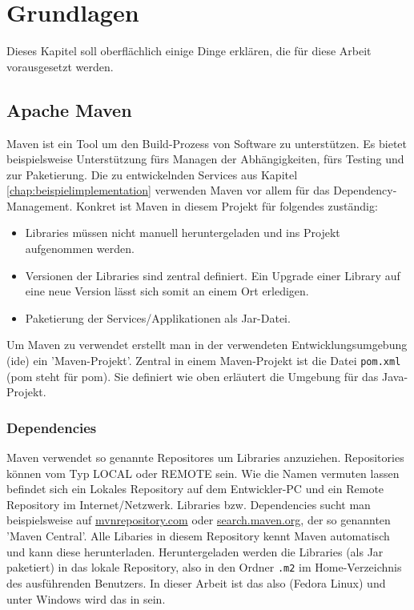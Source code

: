 \chapter{Grundlagen}
\label{chap:voraussetzungen}
Dieses Kapitel soll oberflächlich einige Dinge erklären, die für diese Arbeit vorausgesetzt werden.
\section{Apache Maven}
\label{chap:maven}
Maven ist ein Tool um den Build-Prozess von Software zu unterstützen. Es bietet beispielsweise Unterstützung fürs Managen der Abhängigkeiten, fürs Testing und zur Paketierung. Die zu entwickelnden Services aus Kapitel \ref{chap:beispielimplementation} verwenden Maven vor allem für das Dependency-Management. Konkret ist Maven in diesem Projekt für folgendes zuständig:
\begin{itemize}
	\item
	Libraries müssen nicht manuell heruntergeladen und ins Projekt aufgenommen werden.
	\item
	Versionen der Libraries sind zentral definiert. Ein Upgrade einer Library auf eine neue Version lässt sich somit an einem Ort erledigen.
	\item
	Paketierung der Services/Applikationen als Jar-Datei.
\end{itemize}
Um Maven zu verwendet erstellt man in der verwendeten Entwicklungsumgebung (\acrshort{ide}) ein 'Maven-Projekt'. Zentral in einem Maven-Projekt ist die Datei \texttt{pom.xml} (\acrshort{pom} steht für \acrlong{pom}). Sie definiert wie oben erläutert die Umgebung für das Java-Projekt.

\subsection{Dependencies}
Maven verwendet so genannte Repositores um Libraries anzuziehen. Repositories können vom Typ LOCAL oder REMOTE sein. Wie die Namen vermuten lassen befindet sich ein Lokales Repository auf dem Entwickler-PC und ein Remote Repository im Internet/Netzwerk. Libraries bzw. Dependencies sucht man beispielsweise auf \href{https://mvnrepository.com/}{mvnrepository.com} oder \href{https://search.maven.org}{search.maven.org}, der so genannten 'Maven Central'. Alle Libaries in diesem Repository kennt Maven automatisch und kann diese herunterladen. Heruntergeladen werden die Libraries (als Jar paketiert) in das lokale Repository, also in den Ordner \texttt{.m2} im Home-Verzeichnis des ausführenden Benutzers. In dieser Arbeit ist das also  (Fedora Linux) und unter Windows wird das in  sein.

